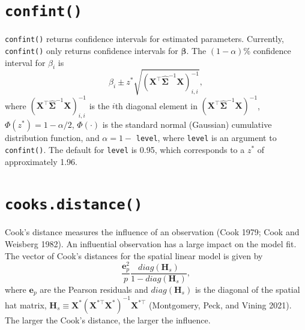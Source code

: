 \documentclass{article}
\begin{document}
\hypertarget{sec:confint}{%
\section{\texorpdfstring{\texttt{confint()}}{confint()}}\label{sec:confint}}

\texttt{confint()} returns confidence intervals for estimated
parameters. Currently, \texttt{confint()} only returns confidence
intervals for \(\boldsymbol{\beta}\). The \((1 - \alpha)\)\% confidence
interval for \(\beta_i\) is \begin{equation*}
\hat{\beta}_i \pm z^* \sqrt{(\mathbf{X}^\top \hat{\boldsymbol{\Sigma}}^{-1} \mathbf{X})^{-1}_{i, i}},
\end{equation*} where
\((\mathbf{X}^\top \hat{\boldsymbol{\Sigma}}^{-1} \mathbf{X})^{-1}_{i, i}\)
is the \(i\)th diagonal element in
\((\mathbf{X}^\top \hat{\boldsymbol{\Sigma}}^{-1} \mathbf{X})^{-1}\),
\(\Phi(z^*) = 1 - \alpha / 2\), \(\Phi(\cdot)\) is the standard normal
(Gaussian) cumulative distribution function, and \(\alpha = 1 -\)
\texttt{level}, where \texttt{level} is an argument to
\texttt{confint()}. The default for \texttt{level} is 0.95, which
corresponds to a \(z^*\) of approximately 1.96.

\hypertarget{sec:cooks}{%
\section{\texorpdfstring{\texttt{cooks.distance()}}{cooks.distance()}}\label{sec:cooks}}

Cook's distance measures the influence of an observation (Cook 1979;
Cook and Weisberg 1982). An influential observation has a large impact
on the model fit. The vector of Cook's distances for the spatial linear
model is given by \begin{equation} \label{eq:cooksd}
\frac{\mathbf{e}_p^2}{p}\frac{diag(\mathbf{H}_s)}{1 - diag(\mathbf{H}_s)},
\end{equation} where \(\mathbf{e}_p\) are the Pearson residuals and
\(diag(\mathbf{H}_s)\) is the diagonal of the spatial hat matrix,
\(\mathbf{H}_s \equiv \mathbf{X}^* (\mathbf{X}^{* \top} \mathbf{X}^*)^{-1} \mathbf{X}^{* \top}\)
(Montgomery, Peck, and Vining 2021). The larger the Cook's distance, the
larger the influence.
\end{document}

